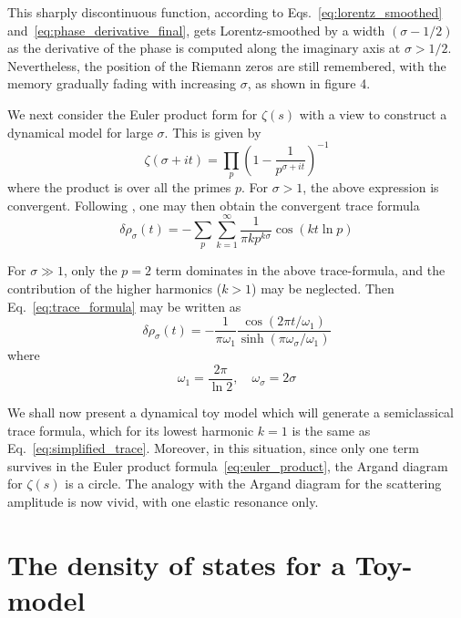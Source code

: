 \documentclass[11pt]{article}
\theoremstyle{plain}
\begin{document}
This sharply discontinuous function, according to Eqs.~\eqref{eq:lorentz_smoothed} and~\eqref{eq:phase_derivative_final}, gets Lorentz-smoothed by a width $(\sigma - 1/2)$ as the derivative of the phase is computed along the imaginary axis at $\sigma > 1/2$. Nevertheless, the position of the Riemann zeros are still remembered, with the memory gradually fading with increasing $\sigma$, as shown in figure 4.

We next consider the Euler product form for $\zeta(s)$ with a view to construct a dynamical model for large $\sigma$. This is given by \cite{edwards1974}
\begin{equation}
\zeta(\sigma + it) = \prod_p \left(1 - \frac{1}{p^{\sigma+it}}\right)^{-1}
\label{eq:euler_product}
\end{equation}
where the product is over all the primes $p$. For $\sigma > 1$, the above expression is convergent. Following \cite{berry1985}, one may then obtain the convergent trace formula
\begin{equation}
\delta\rho_\sigma(t) = -\sum_p \sum_{k=1}^{\infty} \frac{1}{\pi k p^{k\sigma}} \cos(kt \ln p)
\label{eq:trace_formula}
\end{equation}

For $\sigma \gg 1$, only the $p = 2$ term dominates in the above trace-formula, and the contribution of the higher harmonics ($k > 1$) may be neglected. Then Eq.~\eqref{eq:trace_formula} may be written as \cite{berry1986}
\begin{equation}
\delta\rho_\sigma(t) = -\frac{1}{\pi \omega_1} \frac{\cos(2\pi t/\omega_1)}{\sinh(\pi\omega_\sigma/\omega_1)}
\label{eq:simplified_trace}
\end{equation}
where
\begin{equation}
\omega_1 = \frac{2\pi}{\ln 2}, \quad \omega_\sigma = 2\sigma
\label{eq:frequencies}
\end{equation}

We shall now present a dynamical toy model which will generate a semiclassical trace formula, which for its lowest harmonic $k = 1$ is the same as Eq.~\eqref{eq:simplified_trace}. Moreover, in this situation, since only one term survives in the Euler product formula~\eqref{eq:euler_product}, the Argand diagram for $\zeta(s)$ is a circle. The analogy with the Argand diagram for the scattering amplitude is now vivid, with one elastic resonance only.

\section{The density of states for a Toy-model}
\end{document}
